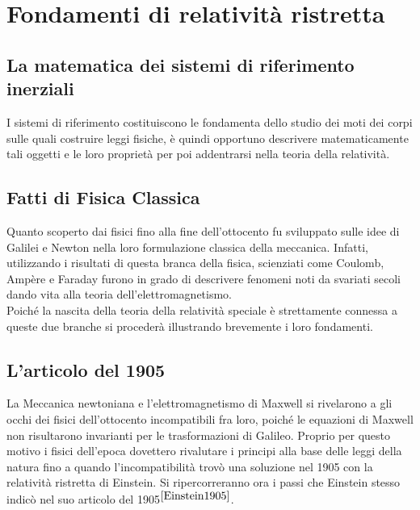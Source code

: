 \documentclass[12pt,a4paper]{book}
\numberwithin{equation}{section}
\begin{document}
\begin{sloppypar}
\frontmatter

 

\tableofcontents
\mainmatter



\chapter{Fondamenti di relatività ristretta}

\section{La matematica dei sistemi di riferimento inerziali}
\label{sec:MathSDRI}
I sistemi di riferimento costituiscono le fondamenta dello studio dei moti dei corpi sulle quali costruire leggi fisiche, è quindi opportuno descrivere matematicamente tali oggetti e le loro proprietà per poi addentrarsi nella teoria della relatività.



\section{Fatti di Fisica Classica}
Quanto scoperto dai fisici fino alla fine dell'ottocento fu sviluppato sulle idee di Galilei e Newton nella loro formulazione classica della meccanica. Infatti, utilizzando i risultati di questa branca della fisica, scienziati come Coulomb, Ampère e Faraday furono in grado di descrivere fenomeni noti da svariati secoli dando vita alla teoria dell'elettromagnetismo.\\
Poiché la nascita della teoria della relatività speciale è strettamente connessa a queste due branche si procederà illustrando brevemente i loro fondamenti. 





\section{L'articolo del 1905}
La Meccanica newtoniana e l'elettromagnetismo di Maxwell si rivelarono a gli occhi dei fisici dell'ottocento 
incompatibili fra loro, 
poiché le equazioni di Maxwell non risultarono invarianti per le trasformazioni di Galileo. 
Proprio per questo motivo i fisici dell'epoca dovettero rivalutare i principi alla base delle leggi 
della natura fino a quando l'incompatibilità trovò una soluzione nel 1905 con la relatività ristretta di Einstein.
Si ripercorreranno ora i passi che Einstein stesso indicò nel suo articolo del 1905$^{\cite{Einstein1905}}$.




\end{sloppypar}
\end{document}
